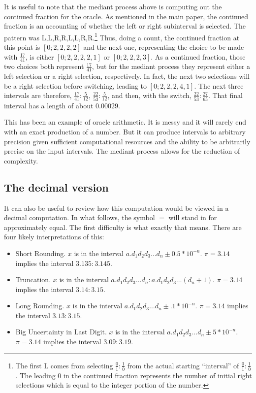 \documentclass[12pt]{article}
\begin{document}
It is useful to note that the mediant process above is computing out the continued fraction for the oracle. As mentioned in the main paper, the continued fraction is an accounting of whether the left or right subinterval is selected. The pattern was L,L,R,R,L,L,R,R.\footnote{The first L comes from selecting $\frac{0}{1}: \frac{1}{0}$ from the actual starting ``interval'' of $\frac{0}{1}: \frac{1}{0}$. The leading 0 in the continued fraction represents the number of initial right selections which is equal to the integer portion of the number.} Thus, doing a count, the continued fraction at this point is $[0;2,2,2,2]$ and the next one, representing the choice to be made with $\frac{17}{41}$, is either $[0;2,2,2,2,1]$ or $[0;2,2,2,3]$. As a continued fraction, those two choices both represent $\frac{17}{41}$, but for the mediant process they represent either a left selection or a right selection, respectively. In fact, the next two selections will be a right selection before switching, leading to $[0;2,2,2,4,1]$. The next three intervals are therefore, $\frac{17}{41}: \frac{5}{12}$, $\frac{22}{53}: \frac{5}{12}$, and then, with the switch, $\frac{22}{53}: \frac{27}{65}$. That final interval has a length of about $0.00029$. 

This has been an example of oracle arithmetic. It is messy and it will rarely end with an exact production of a number. But it can produce intervals to arbitrary precision given sufficient computational resources and the ability to be arbitrarily precise on the input intervals. The mediant process allows for the reduction of complexity. 

\subsection{The decimal version}

It can also be useful to review how this computation would be viewed in a decimal computation. In what follows, the symbol $=$ will stand in for approximately equal. The first difficulty is what exactly that means. There are four likely interpretations of this:

\begin{itemize}
\item Short Rounding. $x$ is in the interval $a.d_1d_2d_3\ldots d_n \pm 0.5*10^{-n}$. $\pi = 3.14$ implies the interval $3.135:3.145$.
\item Truncation. $x$ is in the interval $a.d_1d_2d_3\ldots d_n: a.d_1d_2d_3\ldots (d_n+1)$. $\pi=3.14$ implies the interval $3.14:3.15$.
\item Long Rounding. $x$ is in the interval $a.d_1d_2d_3\ldots d_n \pm .1*10^{-n}$. $\pi = 3.14$ implies the interval $3.13:3.15$. 
\item Big Uncertainty in Last Digit. $x$ is in the interval $a.d_1d_2d_3\ldots d_n \pm 5*10^{-n}$. $\pi = 3.14$ implies the interval $3.09:3.19$. 
\end{itemize}
\end{document}
